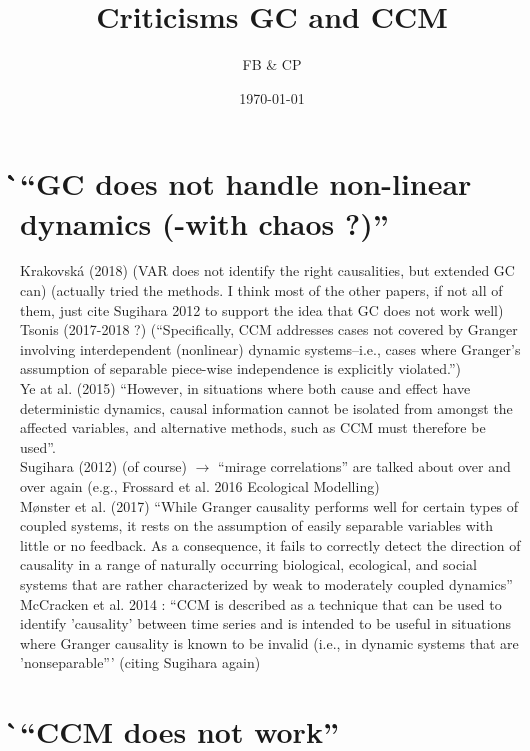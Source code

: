 \documentclass[a4paper,10pt]{article}
\title{Criticisms GC and CCM}
\author{FB \& CP}
\date{\today}
\begin{document}
\maketitle

\section{̀̀``GC does not handle non-linear dynamics (-with chaos ?)''}

Krakovská (2018) (VAR does not identify the right causalities, but extended GC can) (actually tried the methods. I think most of the other papers, if not all of them, just cite Sugihara 2012 to support the idea that GC does not work well)\\

Tsonis (2017-2018 ?) (``Specifically, CCM addresses cases not covered by Granger  involving  interdependent  (nonlinear)  dynamic  systems–i.e.,  cases  where Granger’s assumption of separable piece-wise independence is explicitly violated.'')\\

Ye at al. (2015) ``However, in situations where both cause and effect have deterministic dynamics, causal information cannot be isolated from amongst the affected variables, and alternative methods, such as CCM must therefore be used''.\\

Sugihara (2012) (of course) $\rightarrow$ ``mirage correlations'' are talked about over and over again (e.g., Frossard et al. 2016 Ecological Modelling)\\

M\o{}nster et al. (2017)  ``While Granger causality performs well for certain types of coupled systems, it rests on the assumption of easily separable variables with little or no feedback. As a consequence, it fails to correctly detect the direction of causality in a range of naturally occurring biological, ecological, and social systems that are rather characterized by weak to moderately coupled dynamics''\\

McCracken et al. 2014 : ``CCM is described as a technique that can be used to identify 'causality' between time series and is intended to be useful in situations where Granger causality is known to be invalid (i.e., in dynamic systems that are 'nonseparable''' (citing Sugihara again)

\section{̀``CCM does not work''}
\end{document}
